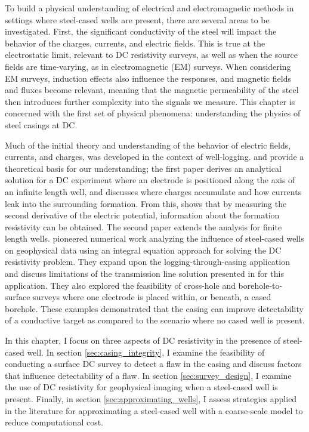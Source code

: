 To build a physical understanding of electrical and electromagnetic methods in settings where steel-cased wells are present, there are several areas to be investigated. First, the significant conductivity of the steel will impact the behavior of the charges, currents, and electric fields. This is true at the electrostatic limit, relevant to DC resistivity surveys, as well as when the source fields are time-varying, as in electromagnetic (EM) surveys. When considering EM surveys, induction effects also influence the responses, and magnetic fields and fluxes become relevant, meaning that the magnetic permeability of the steel then introduces further complexity into the signals we measure. This chapter is concerned with the first set of physical phenomena: understanding the physics of steel casings at DC.

Much of the initial theory and understanding of the behavior of electric fields, currents, and charges, was developed in the context of well-logging. \cite{Kaufman1990} and \cite{Kaufman1993} provide a theoretical basis for our understanding; the first paper derives an analytical solution for a DC experiment where an electrode is positioned along the axis of an infinite length well, and discusses where charges accumulate and how currents leak into the surrounding formation. From this, \cite{Kaufman1990} shows that by measuring the second derivative of the electric potential, information about the formation resistivity can be obtained. The second paper extends the analysis for finite length wells. \cite{Schenkel1990, Schenkel1991, Schenkel1994} pioneered numerical work analyzing the influence of steel-cased wells on geophysical data using an integral equation approach for solving the DC resistivity problem. They expand upon the logging-through-casing application and discuss limitations of the transmission line solution presented in \cite{Kaufman1990} for this application. They also explored the feasibility of cross-hole and borehole-to-surface surveys where one electrode is placed within, or beneath, a cased borehole. These examples demonstrated that the casing can improve detectability of a conductive target as compared to the scenario where no cased well is present.

In this chapter, I focus on three aspects of DC resistivity in the presence of steel-cased well. In section \ref{sec:casing_integrity}, I examine the feasibility of conducting a surface DC survey to detect a flaw in the casing and discuss factors that influence detectability of a flaw. In section \ref{sec:survey_design}, I examine the use of DC resistivity for geophysical imaging when a steel-cased well is present. Finally, in section \ref{sec:approximating_wells}, I assess strategies applied in the literature for approximating a steel-cased well with a coarse-scale model to reduce computational cost.

